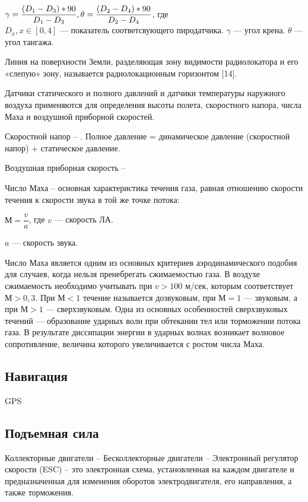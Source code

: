 \documentclass[nir, och, master]{SCWorks}
\begin{document}
$\gamma = \dfrac{(D_1 - D_3) * 90 }{D_1 - D_3}, \\ \theta = \dfrac{(D_2 - D_4) * 90}{D_2 - D_4}$, где \\
$D_x, x \in [0, 4]$ --- показатель соответсвующего пиродатчика.
$\gamma$ --- угол крена.
$\theta$ --- угол тангажа.

Линия на поверхности Земли, разделяющая зону видимости радиолокатора и его «слепую» зону, 
называется радиолокационным горизонтом [14].

Датчики статического и полного давлений и датчики температуры наружного воздуха применяются 
для определения высоты полета, скоростного напора, числа Маха и воздушной приборной скоростей.

Скоростной напор  – . Полное давление = динамическое давление (скоростной напор) + статическое давление.

Воздушная приборная скорость –

Число Маха – основная характеристика течения газа, равная отношению скорости течения к скорости звука 
в той же точке потока: 

$М = \dfrac{v}{a}$, где 
$v$ --- скорость ЛА.

$a$ --- скорость звука.
 
Число Маха является одним из основных критериев аэродинамического подобия для случаев, 
когда нельзя пренебрегать сжимаемостью газа. В воздухе сжимаемость необходимо 
учитывать при $v > 100$ м/сек, которым соответствует $М > 0,3$. При $М < 1$ 
течение называется дозвуковым, при $М = 1$ — звуковым, а при $М > 1$ — сверхзвуковым. 
Одна из основных особенностей сверхзвуковых течений — образование ударных волн при обтекании 
тел или торможении потока газа. В результате диссипации энергии в ударных волнах возникает 
волновое сопротивление, величина которого увеличивается с ростом числа Маха.


\subsection*{Навигация}

GPS

\subsection*{Подъемная сила}

Коллекторные двигатели – 
Бесколлекторные двигатели –
Электронный регулятор скорости (ESC) – это электронная схема, установленная на каждом 
двигателе и предназначенная для изменения оборотов электродвигателя, его направления, 
а также торможения.
\end{document}
